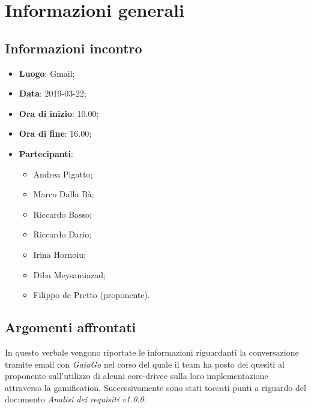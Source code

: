 \section{Informazioni generali}

\subsection{Informazioni incontro}
\begin{itemize}
\item \textbf{Luogo}: Gmail;
\item \textbf{Data}: 2019-03-22;
\item \textbf{Ora di inizio}: 10.00;
\item \textbf{Ora di fine}: 16.00;
\item \textbf{Partecipanti}: 
\begin{itemize}
	\item Andrea Pigatto;
	\item Marco Dalla Bà;
	\item Riccardo Basso;
	\item Riccardo Dario;
	\item Irina Hornoiu;
	\item Diba Meysamiazad;
	\item Filippo de Pretto (proponente).
\end{itemize}
\end{itemize}

\subsection{Argomenti affrontati}
In questo verbale vengono riportate le informazioni riguardanti la conversazione tramite email con \textit{GaiaGo} nel corso del quale il team ha posto dei quesiti al proponente sull'utilizzo di alcuni core-drive\glosp e sulla loro implementazione attraverso la gamification\glo. Successivamente sono stati toccati punti a riguardo del documento \textit{Analisi dei requisiti v1.0.0}.

